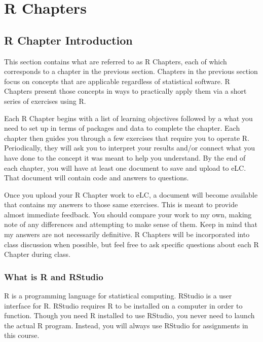 \documentclass[
]{book}
\begin{document}
\hypertarget{part-r-chapters}{%
\part{R Chapters}\label{part-r-chapters}}

\hypertarget{r-chapter-introduction}{%
\chapter{R Chapter Introduction}\label{r-chapter-introduction}}

This section contains what are referred to as R Chapters, each of which corresponds to a chapter in the previous section. Chapters in the previous section focus on concepts that are applicable regardless of statistical software. R Chapters present those concepts in ways to practically apply them via a short series of exercises using R.

Each R Chapter begins with a list of learning objectives followed by a what you need to set up in terms of packages and data to complete the chapter. Each chapter then guides you through a few exercises that require you to operate R. Periodically, they will ask you to interpret your results and/or connect what you have done to the concept it was meant to help you understand. By the end of each chapter, you will have at least one document to save and upload to eLC. That document will contain code and answers to questions.

Once you upload your R Chapter work to eLC, a document will become available that contains my answers to those same exercises. This is meant to provide almost immediate feedback. You should compare your work to my own, making note of any differences and attempting to make sense of them. Keep in mind that my answers are not necessarily definitive. R Chapters will be incorporated into class discussion when possible, but feel free to ask specific questions about each R Chapter during class.

\hypertarget{what-is-r-and-rstudio}{%
\section{What is R and RStudio}\label{what-is-r-and-rstudio}}

R is a programming language for statistical computing. RStudio is a user interface for R. RStudio requires R to be installed on a computer in order to function. Though you need R installed to use RStudio, you never need to launch the actual R program. Instead, you will always use RStudio for assignments in this course.
\end{document}
